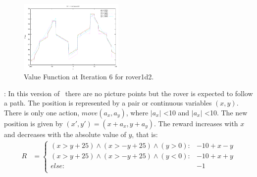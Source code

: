\begin{figure}[h!]
\center
\includegraphics[width=0.45\textwidth]{Figures/rover1D/rover1d2V6.pdf} 
\caption{Value Function at Iteration 6 for rover1d2.}
\label{steplin} 
\end{figure}

\MarsRoverBi: In this version of \MarsRover ~there are no picture points but the rover is expected to follow a path. The position is represented by a pair or continuous variables $(x,y)$. There is only one action, $move(a_x,a_y)$, where $|a_x|$ <10 and $|a_x|$ <10. The new position is given by $(x',y') = ( x+a_x, y+a_y)$. The reward increases with $x$ and decreases with the absolute value of $y$, that is:
{\footnotesize
\begin{align*}
R & = \begin{cases}
(x > y +25) \wedge (x > - y  +25) \wedge (y >0): &-10 + x -y\\
(x > y +25) \wedge (x > - y  +25) \wedge (y <0): & -10 + x +y\\
else: & -1\\
\end{cases}
\end{align*}}

